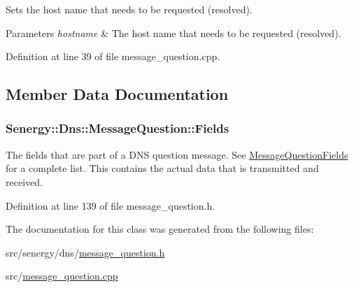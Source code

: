 Sets the host name that needs to be requested (resolved). 


\begin{DoxyParams}{Parameters}
{\em hostname} & The host name that needs to be requested (resolved). \\
\hline
\end{DoxyParams}


Definition at line 39 of file message\-\_\-question.\-cpp.



\subsection{Member Data Documentation}
\hypertarget{class_senergy_1_1_dns_1_1_message_question_a9fad900307a2b2f48c441b657429102f}{
\subsubsection[{Fields}]{ Senergy\-::\-Dns\-::\-Message\-Question\-::\-Fields}}\label{class_senergy_1_1_dns_1_1_message_question_a9fad900307a2b2f48c441b657429102f}


The fields that are part of a D\-N\-S question message. See \hyperlink{struct_senergy_1_1_dns_1_1_message_question_fields}{Message\-Question\-Fields} for a complete list. This contains the actual data that is transmitted and received. 



Definition at line 139 of file message\-\_\-question.\-h.



The documentation for this class was generated from the following files\-:\begin{DoxyCompactItemize}
\item 
src/senergy/dns/\hyperlink{message__question_8h}{message\-\_\-question.\-h}\item 
src/\hyperlink{message__question_8cpp}{message\-\_\-question.\-cpp}\end{DoxyCompactItemize}
